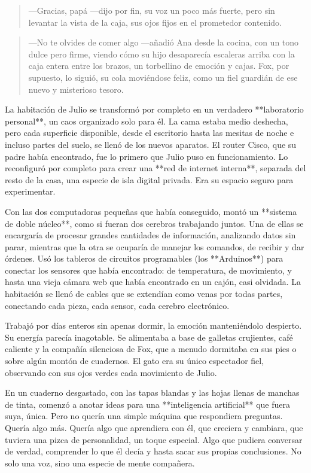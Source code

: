 \documentclass[a4paper,12pt]{book}
\begin{document}
\begin{quote}
    —Gracias, papá —dijo por fin, su voz un poco más fuerte, pero sin levantar la vista de la caja, sus ojos fijos en el prometedor contenido.
\end{quote}

\begin{quote}
    —No te olvides de comer algo —añadió Ana desde la cocina, con un tono dulce pero firme, viendo cómo su hijo desaparecía escaleras arriba con la caja entera entre los brazos, un torbellino de emoción y cajas. Fox, por supuesto, lo siguió, su cola moviéndose feliz, como un fiel guardián de ese nuevo y misterioso tesoro.
\end{quote}

La habitación de Julio se transformó por completo en un verdadero **laboratorio personal**, un caos organizado solo para él. La cama estaba medio deshecha, pero cada superficie disponible, desde el escritorio hasta las mesitas de noche e incluso partes del suelo, se llenó de los nuevos aparatos. El router Cisco, que su padre había encontrado, fue lo primero que Julio puso en funcionamiento. Lo reconfiguró por completo para crear una **red de internet interna**, separada del resto de la casa, una especie de isla digital privada. Era su espacio seguro para experimentar.

Con las dos computadoras pequeñas que había conseguido, montó un **sistema de doble núcleo**, como si fueran dos cerebros trabajando juntos. Una de ellas se encargaría de procesar grandes cantidades de información, analizando datos sin parar, mientras que la otra se ocuparía de manejar los comandos, de recibir y dar órdenes. Usó los tableros de circuitos programables (los **Arduinos**) para conectar los sensores que había encontrado: de temperatura, de movimiento, y hasta una vieja cámara web que había encontrado en un cajón, casi olvidada. La habitación se llenó de cables que se extendían como venas por todas partes, conectando cada pieza, cada sensor, cada cerebro electrónico.

Trabajó por días enteros sin apenas dormir, la emoción manteniéndolo despierto. Su energía parecía inagotable. Se alimentaba a base de galletas crujientes, café caliente y la compañía silenciosa de Fox, que a menudo dormitaba en sus pies o sobre algún montón de cuadernos. El gato era su único espectador fiel, observando con sus ojos verdes cada movimiento de Julio.

En un cuaderno desgastado, con las tapas blandas y las hojas llenas de manchas de tinta, comenzó a anotar ideas para una **inteligencia artificial** que fuera suya, única. Pero no quería una simple máquina que respondiera preguntas. Quería algo más. Quería algo que aprendiera con él, que creciera y cambiara, que tuviera una pizca de personalidad, un toque especial. Algo que pudiera conversar de verdad, comprender lo que él decía y hasta sacar sus propias conclusiones. No solo una voz, sino una especie de mente compañera.
\end{document}
